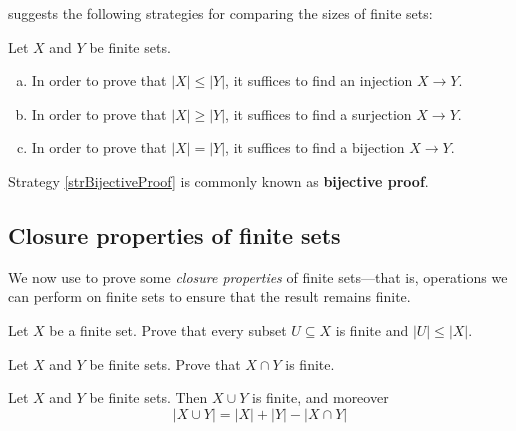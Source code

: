  suggests the following strategies for comparing the sizes of finite sets:

\begin{strategy}
\label{strComparingSizesOfFiniteSets}
Let $X$ and $Y$ be finite sets.
\begin{enumerate}[(a)]
\item In order to prove that $|X| \le |Y|$, it suffices to find an injection $X \to Y$.
\item In order to prove that $|X| \ge |Y|$, it suffices to find a surjection $X \to Y$.
\item \label{strBijectiveProof} In order to prove that $|X| = |Y|$, it suffices to find a bijection $X \to Y$.
\end{enumerate}
Strategy \ref{strBijectiveProof} is commonly known as \textbf{bijective proof}.
\end{strategy}

\subsection*{Closure properties of finite sets}

We now use  to prove some \textit{closure properties} of finite sets---that is, operations we can perform on finite sets to ensure that the result remains finite.

\begin{exercise}
Let $X$ be a finite set. Prove that every subset $U \subseteq X$ is finite and $|U| \le |X|$.
\end{exercise}

\begin{exercise}
Let $X$ and $Y$ be finite sets. Prove that $X \cap Y$ is finite.
\end{exercise}

\begin{proposition}
\label{propUnionOfFiniteSetsIsFinite}
Let $X$ and $Y$ be finite sets. Then $X \cup Y$ is finite, and moreover
\[ |X \cup Y| = |X| + |Y| - |X \cap Y| \]
\end{proposition}


